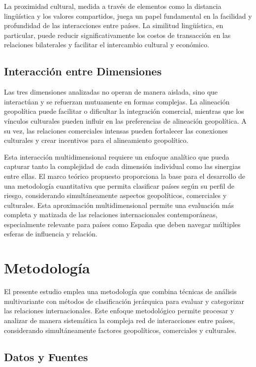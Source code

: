 \documentclass[11pt,a4paper]{article}
\begin{document}
La proximidad cultural, medida a través de elementos como la distancia lingüística y los valores compartidos, juega un papel fundamental en la facilidad y profundidad de las interacciones entre países. La similitud lingüística, en particular, puede reducir significativamente los costos de transacción en las relaciones bilaterales y facilitar el intercambio cultural y económico.

\subsection{Interacción entre Dimensiones}

Las tres dimensiones analizadas no operan de manera aislada, sino que interactúan y se refuerzan mutuamente en formas complejas. La alineación geopolítica puede facilitar o dificultar la integración comercial, mientras que los vínculos culturales pueden influir en las preferencias de alineación geopolítica. A su vez, las relaciones comerciales intensas pueden fortalecer las conexiones culturales y crear incentivos para el alineamiento geopolítico.

Esta interacción multidimensional requiere un enfoque analítico que pueda capturar tanto la complejidad de cada dimensión individual como las sinergias entre ellas. El marco teórico propuesto proporciona la base para el desarrollo de una metodología cuantitativa que permita clasificar países según su perfil de riesgo, considerando simultáneamente aspectos geopolíticos, comerciales y culturales. Esta aproximación multidimensional permite una evaluación más completa y matizada de las relaciones internacionales contemporáneas, especialmente relevante para países como España que deben navegar múltiples esferas de influencia y relación.
\section{Metodología}

El presente estudio emplea una metodología que combina técnicas de análisis multivariante con métodos de clasificación jerárquica para evaluar y categorizar las relaciones internacionales. Este enfoque metodológico permite procesar y analizar de manera sistemática la compleja red de interacciones entre países, considerando simultáneamente factores geopolíticos, comerciales y culturales.

\subsection{Datos y Fuentes}
\end{document}
